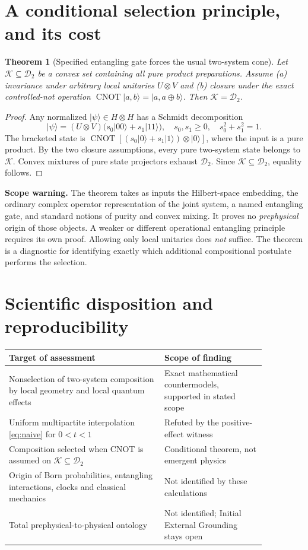 \documentclass[11pt,letterpaper]{article}
\newtheorem{theorem}{Theorem}
\newcommand{\D}{\mathcal{D}}
\newcommand{\K}{\mathcal{K}}
\begin{document}
\section{A conditional selection principle, and its cost}
\begin{theorem}[Specified entangling gate forces the usual two-system cone]
\label{thm:cnot}
Let $\K\subseteq\D_2$ be a convex set containing all pure product
preparations. Assume (a) invariance under arbitrary local unitaries
$U\otimes V$ and (b) closure under the exact controlled-not operation
$\operatorname{CNOT}|a,b\rangle=|a,a\oplus b\rangle$.
Then $\K=\D_2$.
\end{theorem}
\begin{proof}
Any normalized $|\psi\rangle\in H\otimes H$ has a Schmidt decomposition
\[
|\psi\rangle=(U\otimes V)
\bigl(s_0|00\rangle+s_1|11\rangle\bigr),
\quad s_0,s_1\geq0,\quad s_0^2+s_1^2=1.
\]
The bracketed state is
$\operatorname{CNOT}[(s_0|0\rangle+s_1|1\rangle)\otimes|0\rangle]$,
where the input is a pure product. By the two closure assumptions, every
pure two-system state belongs to $\K$. Convex mixtures of pure state
projectors exhaust $\D_2$. Since $\K\subseteq\D_2$, equality follows.
\end{proof}

\noindent\textbf{Scope warning.} The theorem takes as inputs the Hilbert-space
embedding, the ordinary complex operator representation of the joint system,
a named entangling gate, and standard notions of purity and convex mixing.
It proves no \emph{prephysical} origin of those objects. A weaker or different
operational entangling principle requires its own proof. Allowing only local
unitaries does \emph{not} suffice. The theorem is a diagnostic for identifying
exactly which additional compositional postulate performs the selection.

\section{Scientific disposition and reproducibility}
\begin{center}
\begin{tabular}{p{0.52\linewidth}p{0.34\linewidth}}
\toprule
Target of assessment & Scope of finding\\\midrule
Nonselection of two-system composition by local geometry and local quantum effects & Exact mathematical countermodels, supported in stated scope\\
Uniform multipartite interpolation \eqref{eq:naive} for $0<t<1$ & Refuted by the positive-effect witness\\
Composition selected when CNOT is assumed on $\K\subseteq\D_2$ & Conditional theorem, not emergent physics\\
Origin of Born probabilities, entangling interactions, clocks and classical mechanics & Not identified by these calculations\\
Total prephysical-to-physical ontology & Not identified; Initial External Grounding stays open\\\bottomrule
\end{tabular}
\end{center}
\end{document}
